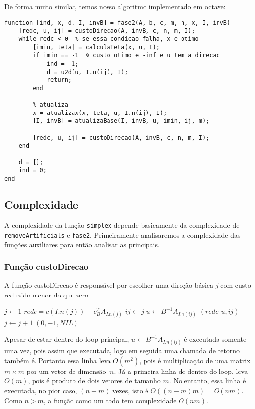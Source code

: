 \documentclass[12pt]{article}
\begin{document}
	De forma muito similar, temos nosso algoritmo implementado em octave:
	\begin{lstlisting}
function [ind, x, d, I, invB] = fase2(A, b, c, m, n, x, I, invB)
    [redc, u, ij] = custoDirecao(A, invB, c, n, m, I);
    while redc < 0  % se essa condicao falha, x e otimo
        [imin, teta] = calculaTeta(x, u, I);
        if imin == -1  % custo otimo e -inf e u tem a direcao
            ind = -1;
            d = u2d(u, I.n(ij), I);
            return;
        end

        % atualiza
        x = atualizax(x, teta, u, I.n(ij), I); 
        [I, invB] = atualizaBase(I, invB, u, imin, ij, m);

        [redc, u, ij] = custoDirecao(A, invB, c, n, m, I);
    end
    
    d = [];
    ind = 0;
end 

    \end{lstlisting}

\subsection{Complexidade}
	A complexidade da função \texttt{simplex} depende basicamente da complexidade de \texttt{removeArtificials} e \texttt{fase2}. Primeiramente analisaremos a complexidade das funções auxiliares para então analisar as principais.

\subsubsection{Função custoDirecao}
A função custoDirecao é responsável por escolher uma direção básica $j$ com custo reduzido menor do que zero.
\begin{algorithmic}
	\State $j \gets 1$
		\State $redc = c(I.n(j)) - c^T_BA_{I.n(j)}$
			\State $ij \gets j$
			\State $u \gets B^{-1}A_{I.n(ij)}$
			\Return $(redc, u, ij)$
		\EndIf
		\State $j \gets j + 1$		
	\EndWhile
	\Return $(0, -1, NIL)$
\EndFunction
\end{algorithmic}

	Apesar de estar dentro do loop principal, $u \gets B^{-1}A_{I.n(ij)}$ é executada somente uma vez, pois assim que executada, logo em seguida uma chamada de retorno também é. Portanto essa linha leva $O(m^2)$, pois é multiplicação de uma matrix $m \times m$ por um vetor de dimensão $m$. Já a primeira linha de dentro do loop, leva $O(m)$, pois é produto de dois vetores de tamanho $m$. No entanto, essa linha é executada, no pior caso, $(n - m)$ vezes, isto é $O((n-m)m) = O(nm)$. Como $n > m$, a função como um todo tem complexidade $O(nm)$.
\end{document}
